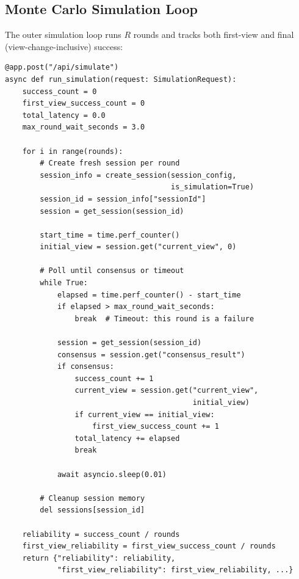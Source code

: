 \documentclass[12pt,a4paper]{article}
\begin{document}
\subsection{Monte Carlo Simulation Loop}

The outer simulation loop runs $R$ rounds and tracks both first-view and final (view-change-inclusive) success:

\begin{lstlisting}[caption={Monte Carlo simulation (\texttt{main.py})}, label=lst:montecarlo]
@app.post("/api/simulate")
async def run_simulation(request: SimulationRequest):
    success_count = 0
    first_view_success_count = 0
    total_latency = 0.0
    max_round_wait_seconds = 3.0

    for i in range(rounds):
        # Create fresh session per round
        session_info = create_session(session_config,
                                      is_simulation=True)
        session_id = session_info["sessionId"]
        session = get_session(session_id)

        start_time = time.perf_counter()
        initial_view = session.get("current_view", 0)

        # Poll until consensus or timeout
        while True:
            elapsed = time.perf_counter() - start_time
            if elapsed > max_round_wait_seconds:
                break  # Timeout: this round is a failure

            session = get_session(session_id)
            consensus = session.get("consensus_result")
            if consensus:
                success_count += 1
                current_view = session.get("current_view",
                                           initial_view)
                if current_view == initial_view:
                    first_view_success_count += 1
                total_latency += elapsed
                break

            await asyncio.sleep(0.01)

        # Cleanup session memory
        del sessions[session_id]

    reliability = success_count / rounds
    first_view_reliability = first_view_success_count / rounds
    return {"reliability": reliability,
            "first_view_reliability": first_view_reliability, ...}
\end{lstlisting}

\end{document}
